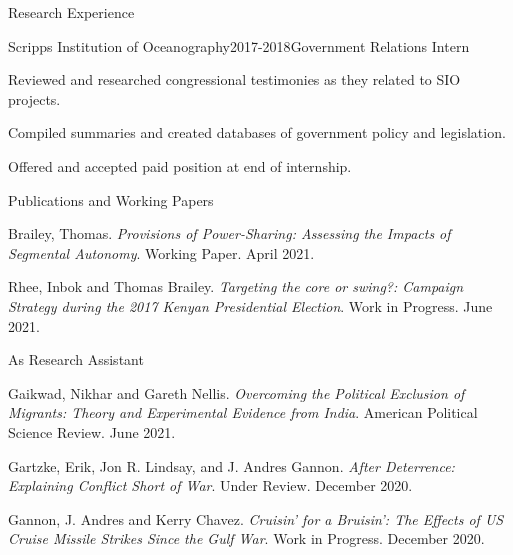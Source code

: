 \documentclass[10pt]{resume} %
\begin{document}
\begin{rSection}{Research Experience}
		\begin{rSubsection}{Scripps Institution of Oceanography}{2017-2018}{Government Relations Intern}{}
			\item Reviewed and researched congressional testimonies as they related to SIO projects.
			\item Compiled summaries and created databases of government policy and legislation.
			\item Offered and accepted paid position at end of internship.
		\end{rSubsection}
		
	\end{rSection}
	
	
	\begin{rSection}{Publications and Working Papers}\itemsep -5pt

		\item	Brailey, Thomas. \textit{Provisions of Power-Sharing: Assessing the Impacts of Segmental Autonomy}. Working Paper. April 2021.

		\item	Rhee, Inbok and Thomas Brailey. \textit{Targeting the core or swing?: Campaign Strategy during the 2017 Kenyan Presidential Election}. Work in Progress. June 2021.
		
		\begin{rSubsection}{As Research Assistant}{}{}{}
		\item	Gaikwad, Nikhar and Gareth Nellis. \textit{Overcoming the Political Exclusion of Migrants: Theory and Experimental Evidence from India}. American Political Science Review. June 2021. 
		\item	Gartzke, Erik, Jon R. Lindsay, and J. Andres Gannon. \textit{After Deterrence: Explaining Conflict Short of War}. Under Review. December 2020. 
		\item	Gannon, J. Andres and Kerry Chavez. \textit{Cruisin’ for a Bruisin’: The Effects of US Cruise Missile Strikes Since the Gulf War}. Work in Progress. December 2020.
		\end{rSubsection}
	
	\end{rSection}
	
\end{document}
